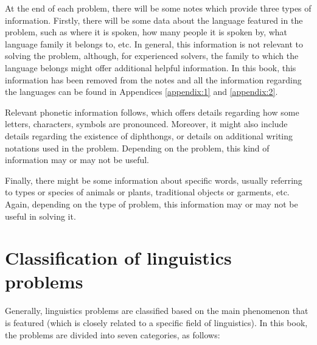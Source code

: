 \begin{enumerate}
At the end of each problem, there will be some notes which provide three types of information. Firstly, there will be some data about the language featured in the problem, such as where it is spoken, how many people it is spoken by, what language family it belongs to, etc. In general, this information is not relevant to solving the problem, although, for experienced solvers, the family to which the language belongs might offer additional helpful information. In this book, this information has been removed from the notes and all the information regarding the languages can be found in Appendices \ref{appendix:1} and \ref{appendix:2}.

Relevant phonetic information follows, which offers details regarding how some letters, characters, symbols are pronounced. Moreover, it might also include details regarding the existence of diphthongs, or details on additional writing notations used in the problem. Depending on the problem, this kind of information may or may not be useful.

Finally, there might be some information about specific words, usually referring to types or species of animals or plants, traditional objects or garments, etc. Again, depending on the type of problem, this information may or may not be useful in solving it.
\end{enumerate}

\section{Classification of linguistics problems}
Generally, linguistics problems are classified based on the main phenomenon that is featured (which is closely related to a specific field of linguistics). In this book, the problems are divided into seven categories, as follows:

